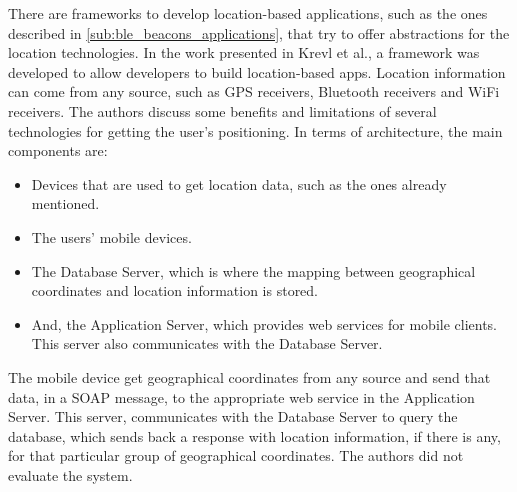 There are frameworks to develop location-based
applications, such as the ones described in
\ref{sub:ble_beacons_applications}, that
try to offer abstractions for the location
technologies.
In the work presented in Krevl et al.\cite{Krevl2006}, 
a framework
was developed to allow developers to build
location-based apps. Location information can come
from any source, such as GPS receivers, Bluetooth
receivers and WiFi receivers.
The authors discuss some benefits and limitations
of several technologies for getting the
user's positioning.
In terms of architecture, the main components
are:
\begin{itemize}
\item
Devices that are used to get location data, such as
the ones already mentioned. 
\item The users' mobile devices.
\item The Database Server, which is where the mapping
between geographical coordinates and location
information is stored.
\item And, the Application Server, which provides web services for
mobile clients. This server also communicates
with the Database Server.
\end{itemize}
The mobile device get geographical coordinates
from any source and send that data, in a
SOAP \cite{Seely:2001:SCP:560836} message,
to the appropriate web service in the Application
Server. This server, communicates with the Database Server
to query the database, which sends back a response with
location information, if there is any, for that
particular group of geographical coordinates.
The authors did not evaluate the system.

